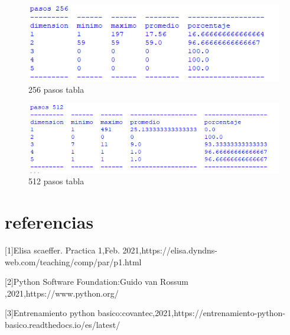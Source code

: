 \documentclass[a4paper]{article}
\begin{document}
    \begin{figure}[H]
      \centering                      %
      \includegraphics[scale=1.1]{256_pasos_tabla.png}   
      \caption{256 pasos tabla} 
      \label{tab256}
    \end{figure}

    \begin{figure}[H]
      \centering                      %
      \includegraphics[scale=1]{512_pasos_tabla.png}   
      \caption{512 pasos tabla} 
      \label{tab512}
    \end{figure}
\section{referencias}


    
    [1]Elisa scaeffer. Practica 1,Feb. 2021,https://elisa.dyndns-web.com/teaching/comp/par/p1.html
    
    [2]Python Software Foundation:Guido van Rossum ,2021,https://www.python.org/
    
    [3]Entrenamiento python basico:covantec,2021,https://entrenamiento-python-basico.readthedocs.io/es/latest/
\end{document}
